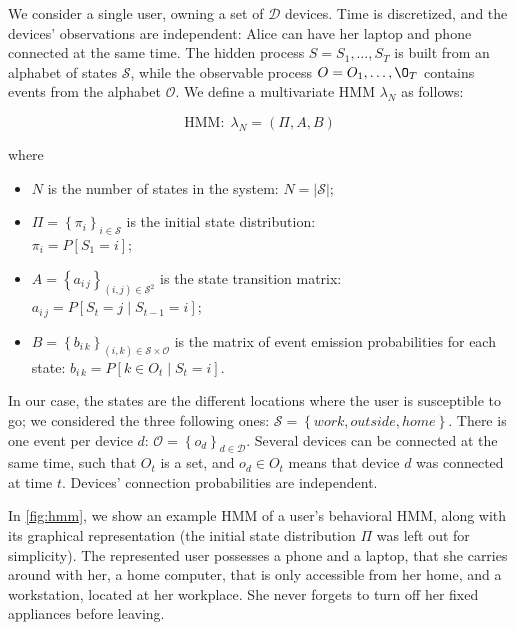 We consider a single user, owning a set of $\mathcal{D}$ devices.
Time is discretized, and the devices' observations are independent: Alice can have her laptop and phone connected at the same time.
The hidden process $S=S_1,\dots,S_T$ is built from an alphabet of states $\mathcal{S}$, while the observable process $O=O_1, \dots, \O_T$ contains events from the alphabet $\mathcal{O}$. We define a multivariate HMM $\lambda_N$ as follows:

$$\text{HMM}:\;\lambda_N=(\Pi, A, B)$$

where 
\begin{itemize}
	\item $N$ is the number of states in the system:
	$N = \left| \mathcal{S} \right|$;

	\item $\Pi=\left\{ \pi_i\right\}_{i\in\mathcal{S}}$ is the initial state distribution:\\
	$\pi_i=P[S_1=i]$;

	\item $A = \left\{ a_{i\,j}\right\}_{(i,j)\in\mathcal{S}^2}$ is the state transition matrix:\\
	$a_{i\,j}=P[S_t=j \mid S_{t-1}=i]$;

	\item $B = \left\{ b_{i\,k}\right\}_{(i,k)\in\mathcal{S}\times\mathcal{O}}$ is the matrix of event emission probabilities for each state:
	$b_{i\,k} = P[ k \in O_t \mid S_t = i]$.
\end{itemize}

In our case, the states are the different locations where the user is susceptible to go;
we considered the three following ones: $\mathcal{S}=\left\{ \mathit{work}, \mathit{outside}, \mathit{home} \right\}$. 
There is one event per device $d$: $\mathcal{O} = \left\{ o_d \right\}_{d\in \mathcal{D}}$. Several devices can be connected at the same time, such that $O_t$ is a set, and $o_d \in O_t$ means that device $d$ was connected at time $t$. Devices' connection probabilities are independent.

In \cref{fig:hmm}, we show an example HMM of a user's behavioral HMM, along with its graphical representation (the initial state distribution $\Pi$ was left out for simplicity). 
The represented user possesses a phone and a laptop, that she carries around with her, a home computer, that is only accessible from her home, and a workstation, located at her workplace. She never forgets to turn off her fixed appliances before leaving.

